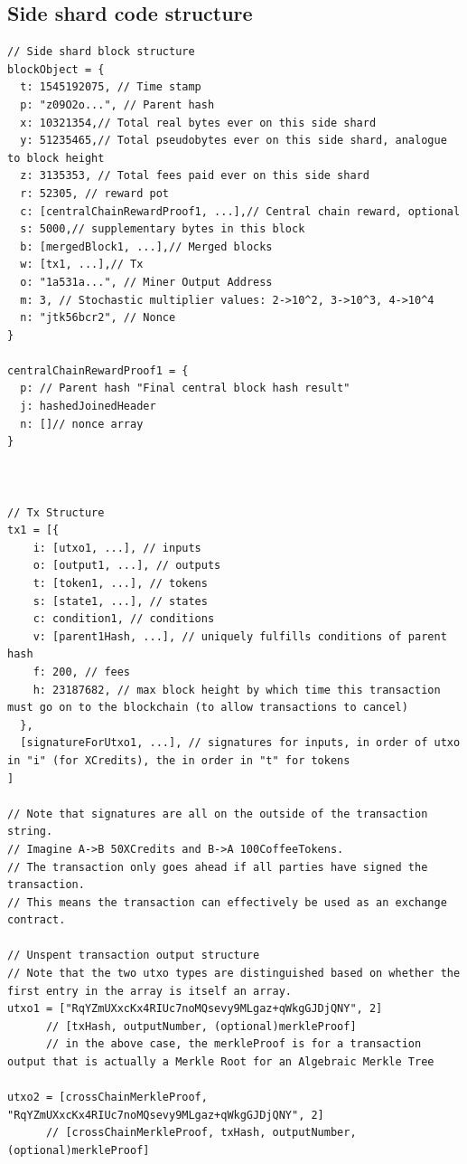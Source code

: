\documentclass[a4paper,12pt]{article}
\begin{document}
\subsection{Side shard code structure}
\begin{lstlisting}
// Side shard block structure
blockObject = {
  t: 1545192075, // Time stamp
  p: "z09O2o...", // Parent hash
  x: 10321354,// Total real bytes ever on this side shard
  y: 51235465,// Total pseudobytes ever on this side shard, analogue to block height
  z: 3135353, // Total fees paid ever on this side shard
  r: 52305, // reward pot
  c: [centralChainRewardProof1, ...],// Central chain reward, optional
  s: 5000,// supplementary bytes in this block
  b: [mergedBlock1, ...],// Merged blocks
  w: [tx1, ...],// Tx
  o: "1a531a...", // Miner Output Address
  m: 3, // Stochastic multiplier values: 2->10^2, 3->10^3, 4->10^4
  n: "jtk56bcr2", // Nonce
}

centralChainRewardProof1 = {
  p: // Parent hash "Final central block hash result"
  j: hashedJoinedHeader
  n: []// nonce array
}



// Tx Structure
tx1 = [{
    i: [utxo1, ...], // inputs
    o: [output1, ...], // outputs
    t: [token1, ...], // tokens
    s: [state1, ...], // states
    c: condition1, // conditions
    v: [parent1Hash, ...], // uniquely fulfills conditions of parent hash
    f: 200, // fees
    h: 23187682, // max block height by which time this transaction must go on to the blockchain (to allow transactions to cancel)
  },
  [signatureForUtxo1, ...], // signatures for inputs, in order of utxo in "i" (for XCredits), the in order in "t" for tokens
]

// Note that signatures are all on the outside of the transaction string.
// Imagine A->B 50XCredits and B->A 100CoffeeTokens. 
// The transaction only goes ahead if all parties have signed the transaction. 
// This means the transaction can effectively be used as an exchange contract.

// Unspent transaction output structure
// Note that the two utxo types are distinguished based on whether the first entry in the array is itself an array. 
utxo1 = ["RqYZmUXxcKx4RIUc7noMQsevy9MLgaz+qWkgGJDjQNY", 2]
      // [txHash, outputNumber, (optional)merkleProof] 
      // in the above case, the merkleProof is for a transaction output that is actually a Merkle Root for an Algebraic Merkle Tree

utxo2 = [crossChainMerkleProof, "RqYZmUXxcKx4RIUc7noMQsevy9MLgaz+qWkgGJDjQNY", 2]
      // [crossChainMerkleProof, txHash, outputNumber, (optional)merkleProof]


\end{lstlisting}
\end{document}
